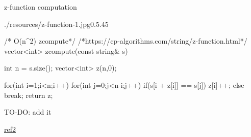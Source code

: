 \begin{problem}{z-function computation}
\end{problem}


\begin{solution}[$O(n^2)$]
    \begin{lfigure}{./resources/z-function-1.jpg}{0.5}{.45}
        \begin{code3}
/* O(n^2) zcompute*/  
/*https://cp-algorithms.com/string/z-function.html*/
vector<int> zcompute(const string& s)
{
    int n = s.size();
    vector<int> z(n,0);

    for(int i=1;i<n;i++)
    {
        for(int j=0;j<n-i;j++)
        {
            if(s[i + z[i]] == s[j])
                z[i]++;
            else
                break;
        }
    }
    return z;
}
        \end{code3}
    \end{lfigure}
\end{solution}

\begin{solution}[O(n)]
    TO-DO: add it 

    \href{https://www.youtube.com/watch?v=CpZh4eF8QBw}{ref2}

\end{solution}